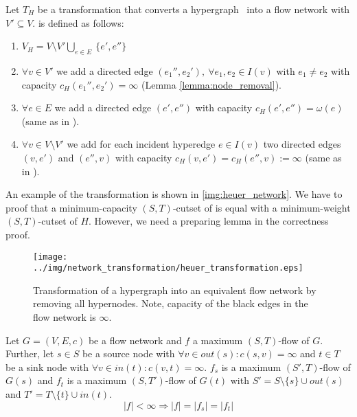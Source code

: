 \begin{definition}
Let $T_H$ be a transformation that converts a hypergraph \HypergraphDef~into 
a flow network  with $V' \subseteq V$.  is defined as follows:
\begin{enumerate}
\item $V_H = V\setminus V' \bigcup\limits_{e \in E}\ \{e', e''\}$
\item $\forall v \in V'$ we add a directed edge $(e_1'', e_2'),\ \forall e_1, e_2 \in I(v)$ 
      with $e_1 \neq e_2$ with capacity $c_H(e_1'', e_2') = \infty$ (Lemma \ref{lemma:node_removal}).
\item $\forall e \in E$ we add a directed edge $(e',e'')$
      with capacity $c_H(e',e'') = \omega(e)$ (same as in ).
\item $\forall v \in V\setminus V'$ we add for each incident hyperedge $e \in I(v)$ two directed
      edges $(v,e')$ and $(e'',v)$ with capacity 
      $c_H(v,e') = c_H(e'',v) := \infty$ (same as in ).
\end{enumerate} 
\end{definition}

An example of the transformation is shown in \autoref{img:heuer_network}.
We have to proof that a minimum-capacity $(S,T)$-cutset
of  is equal with a minimum-weight $(S,T)$-cutset of $H$. However,
we need a preparing lemma in the correctness proof.

\begin{figure}
\centering
\texttt{[image: ../img/network\_transformation/heuer\_transformation.eps]}
\caption{Transformation of a hypergraph into an equivalent flow network by removing
         all hypernodes. Note, capacity of the black edges in the flow network is $\infty$.}
\label{img:heuer_network}
\end{figure}

\begin{lemma}
\label{lemma:source_and_sink_removal}
Let $G = (V,E,c)$ be a flow network and $f$ a maximum $(S,T)$-flow of $G$.
Further, let $s \in S$ be a source node with $\forall v \in out(s): c(s,v) = \infty$
and $t \in T$ be a sink node with $\forall v \in in(t): c(v,t) = \infty$.
$f_s$ is a maximum $(S',T)$-flow of $G(s)$ and $f_t$ is a maximum $(S,T')$-flow
of $G(t)$ with $S' = S\setminus \{s\} \cup out(s)$ and $T' = T \setminus \{t\}
\cup in(t)$.
\[|f| < \infty \Rightarrow |f| = |f_s| = |f_t|\]
\end{lemma}

